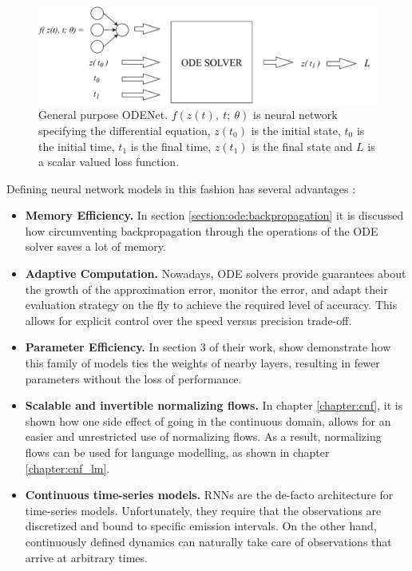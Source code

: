 \begin{figure}[ht]
      \centering
      \includegraphics[width=\columnwidth]{figures/odenets_visualization.pdf}
      \caption{General purpose ODENet. $f(z(t), \ t; \ \theta) $ is neural network specifying the differential equation, $ z(t_0) $ is the initial state, $ t_0 $ is the initial time, $ t_1 $ is the final time, $ z(t_1) $ is the final state and $ L $ is a scalar valued loss function.}
      \label{figure:ode:odenets_visualization}
\end{figure}

Defining neural network models in this fashion has several advantages \cite{chen2018neural}:
\begin{itemize}
    \item \textbf{Memory Efficiency.} In section \ref{section:ode:backpropagation} it is discussed how circumventing backpropagation through the operations of the ODE solver saves a lot of memory.
    \item \textbf{Adaptive Computation.} Nowadays, ODE solvers provide guarantees about the growth of the approximation error, monitor the error, and adapt their evaluation strategy on the fly to achieve the required level of accuracy. This allows for explicit control over the speed versus precision trade-off.
    \item \textbf{Parameter Efficiency.} In section 3 of their work, \citet{chen2018neural} show demonstrate how this family of models ties the weights of nearby layers, resulting in fewer parameters without the loss of performance.
    \item \textbf{Scalable and invertible normalizing flows.} In chapter \ref{chapter:cnf}, it is shown how one side effect of going in the continuous domain, allows for an easier and unrestricted use of normalizing flows. As a result, normalizing flows can be used for language modelling, as shown in chapter \ref{chapter:cnf_lm}.
    \item \textbf{Continuous time-series models.} RNNs are the de-facto architecture for time-series models. Unfortunately, they require that the observations are discretized and bound to specific emission intervals. On the other hand, continuously defined dynamics can naturally take care of observations that arrive at arbitrary times.
\end{itemize}

